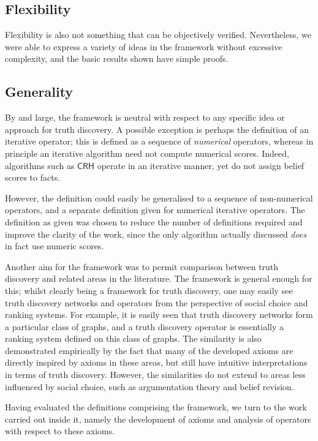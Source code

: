 \documentclass[../../main.tex]{subfiles}
\begin{document}
\subsection*{Flexibility}

Flexibility is also not something that can be objectively verified.
Nevertheless, we were able to express a variety of ideas in the framework
without excessive complexity, and the basic results shown have simple proofs.

\subsection*{Generality}

By and large, the framework is neutral with respect to any specific idea or
approach for truth discovery. A possible exception is perhaps the definition of
an iterative operator; this is defined as a sequence of \emph{numerical}
operators, whereas in principle an iterative algorithm need not compute
numerical scores. Indeed, algorithms such as $\mathsf{CRH}$ \cite{li_conflicts}
operate in an iterative manner, yet do not assign belief scores to facts.

However, the definition could easily be generalised to a sequence of
non-numerical operators, and a separate definition given for numerical
iterative operators. The definition as given was chosen to reduce the number of
definitions required and improve the clarity of the work, since the only
algorithm actually discussed \emph{does} in fact use numeric scores.

Another aim for the framework was to permit comparison between truth discovery
and related areas in the literature. The framework is general enough for this;
whilst clearly being a framework for truth discovery, one may easily see truth
discovery networks and operators from the perspective of social choice and
ranking systems. For example, it is easily seen that truth discovery networks
form a particular class of graphs, and a truth discovery operator is
essentially a ranking system defined on this class of graphs. The similarity is
also demonstrated empirically by the fact that many of the developed axioms are
directly inspired by axioms in these areas, but still have intuitive
interpretations in terms of truth discovery. However, the similarities do not
extend to areas less influenced by social choice, such as argumentation theory
and belief revision.

Having evaluated the definitions comprising the framework, we turn to the work
carried out inside it, namely the development of axioms and analysis of
operators with respect to these axioms.
\end{document}
